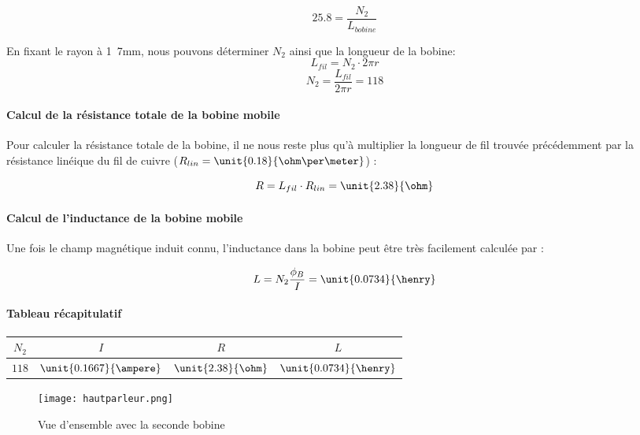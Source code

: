 $$25.8 = \frac{N_2}{L_{bobine}}$$

En fixant le rayon à \unit{1.7}{mm}, nous pouvons déterminer $N_2$ ainsi que la longueur de la bobine:
$$L_{fil} = N_2 \cdot 2\pi r$$ 
$$N_2 =  \frac{L_{fil}}{2\pi r} = 118$$


\paragraph{Calcul de la résistance totale de la bobine mobile}
Pour calculer la résistance totale de la bobine, il ne nous reste plus qu'à multiplier la longueur de fil trouvée 
précédemment par la résistance linéique du fil de cuivre
($R_{lin} = \unit{0.18}{\ohm\per\meter}$) :

$$R = L_{fil} \cdot R_{lin} = \unit{2.38}{\ohm}$$

\paragraph{Calcul de l'inductance de la bobine mobile}

Une fois le champ magnétique induit connu, l'inductance dans la bobine peut être très facilement calculée par :

$$L = N_2 \frac{\phi_B}{I} = \unit{0.0734}{\henry}$$

\paragraph{Tableau récapitulatif}

\begin{center}
	\begin{tabular}{c|c|c|c}
		$N_2$ & $I$ & $R$ & $L$ \\
		\hline
		 $118$ & $\unit{0.1667}{\ampere}$ & $\unit{2.38}{\ohm}$ & $\unit{0.0734}{\henry}$ \\
	\end{tabular}
\end{center}

\begin{figure}[ht!]
\centering
\texttt{[image: hautparleur.png]}
\caption{Vue d'ensemble avec la seconde bobine}
\label{Vue d'ensemble avec la seconde bobine}
\end{figure}


